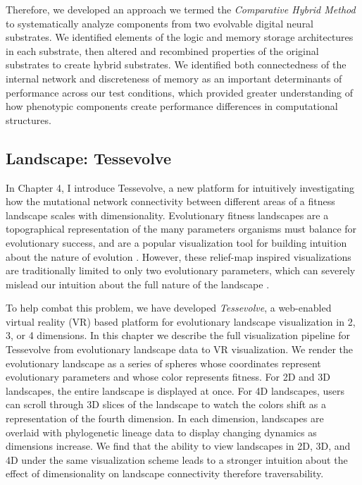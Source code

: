 Therefore, we developed an approach we termed the \textit{Comparative Hybrid Method} to systematically analyze components from two evolvable digital neural substrates.
We identified elements of the logic and memory storage architectures in each substrate, then altered and recombined properties of the original substrates to create hybrid substrates. 
We identified both connectedness of the internal network and discreteness of memory as an important determinants of performance across our test conditions, which provided greater understanding of how phenotypic components create performance differences in computational structures.

\subsection{Landscape: Tessevolve}

In Chapter 4, I introduce Tessevolve, a new platform for intuitively investigating how the mutational network connectivity between different areas of a fitness landscape scales with dimensionality. 
Evolutionary fitness landscapes are a topographical representation of the many parameters organisms must balance for evolutionary success, and are a popular visualization tool for building intuition about the nature of evolution \citep{wright_roles_1932}. 
However, these relief-map inspired visualizations are traditionally limited to only two evolutionary parameters, which can severely mislead our intuition about the full nature of the landscape \citep{kaplan_end_2008, agarwala_adaptive_2019}. 

To help combat this problem, we have developed \textit{Tessevolve}, a web-enabled virtual reality (VR) based platform for evolutionary landscape visualization in 2, 3, or 4 dimensions. 
In this chapter we describe the full visualization pipeline for Tessevolve from evolutionary landscape data to VR visualization. 
We render the evolutionary landscape as a series of spheres whose coordinates represent evolutionary parameters and whose color represents fitness. For 2D and 3D landscapes, the entire landscape is displayed at once. 
For 4D landscapes, users can scroll through 3D slices of the landscape to watch the colors shift as a representation of the fourth dimension. In each dimension, landscapes are overlaid with phylogenetic lineage data to display changing dynamics as dimensions increase. 
We find that the ability to view landscapes in 2D, 3D, and 4D under the same visualization scheme leads to a stronger intuition about the effect of dimensionality on landscape connectivity therefore traversability. 